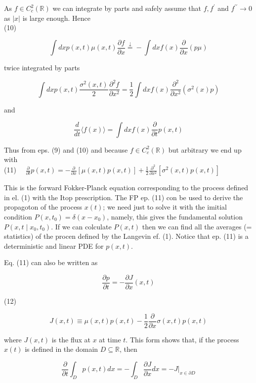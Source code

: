 \documentclass[10pt]{article}
\begin{document}
As $f \in C_{c}^{2}(\mathbb{R})$ we can integrate by parts and safely assume that $f, f^{\prime}$ and $f^{\prime \prime} \rightarrow 0$ as $|x|$ is large enough. Hence\\
(10)

$$
\int d x p(x, t) \mu(x, t) \frac{\partial f}{\partial x} \stackrel{\downarrow}{=}-\int d x f(x) \frac{\partial}{\partial x}(p \mu)
$$

twice integrated by parts

$$
\int d x p(x, t) \frac{\sigma^{2}(x, t)}{2} \frac{\partial^{2} f}{\partial x^{2}}=\frac{1}{2} \int d x f(x) \frac{\partial^{2}}{\partial x^{2}}\left(\sigma^{2}(x) p\right)
$$

and

$$
\frac{d}{d t}\langle f(x)\rangle=\int d x f(x) \frac{\partial}{\partial t} p(x, t)
$$

Thus from eps. (9) and (10) and because $f \in C_{c}^{2}(\mathbb{R})$ but arbitrary we end up with\\
(11) $\quad \frac{\partial}{\partial t} p(x, t)=-\frac{\partial}{\partial x}[\mu(x, t) p(x, t)]+\frac{1}{2} \frac{\partial^{2}}{\partial x^{2}}\left[\sigma^{2}(x, t) p(x, t)\right]$

This is the forward Fokker-Planck equation corresponding to the process defined in el. (1) with the Itop prescription. The FP ep. (11) con be used to derive the propagoton of the process $x(t)$; we need just to solve it with the imitial condition $P\left(x, t_{0}\right)=\delta\left(x-x_{0}\right)$, namely, this gives the fundamental solution $P\left(x, t \mid x_{0}, t_{0}\right)$. If we can colculate $P(x, t)$ then we can find all the averages (= statistics) of the procen defined by the Langevin ef. (1). Notice that ep. (11) is a deterministic and linear PDE for $p(x, t)$.

Eq. (11) can also be written as

$$
\frac{\partial p}{\partial t}=-\frac{\partial J}{\partial x}(x, t)
$$

(12)

$$
J(x, t) \equiv \mu(x, t) p(x, t)-\frac{1}{2} \frac{\partial}{\partial x} \sigma(x, t) p(x, t)
$$

where $J(x, t)$ is the flux at $x$ at time $t$. This form shows that, if the process $x(t)$ is defined in the domain $D \subseteq \mathbb{R}$, then

$$
\frac{\partial}{\partial t} \int_{D} p(x, t) d x=-\int_{D} \frac{\partial J}{\partial x} d x=-\left.J\right|_{x \in \partial D}
$$
\end{document}
